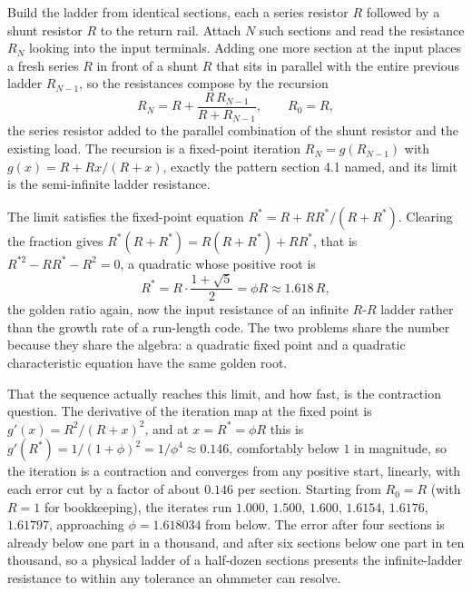 Build the ladder from identical sections, each a series resistor $R$
followed by a shunt resistor $R$ to the return rail. Attach $N$ such
sections and read the resistance $R_{N}$ looking into the input
terminals. Adding one more section at the input places a fresh series $R$
in front of a shunt $R$ that sits in parallel with the entire previous
ladder $R_{N-1}$, so the resistances compose by the recursion
\[
R_{N} = R + \frac{R\,R_{N-1}}{R + R_{N-1}}, \qquad R_{0} = R,
\]
the series resistor added to the parallel combination of the shunt
resistor and the existing load. The recursion is a fixed-point iteration
$R_{N} = g(R_{N-1})$ with $g(x) = R + Rx/(R + x)$, exactly the pattern
section 4.1 named, and its limit is the semi-infinite ladder resistance.

The limit satisfies the fixed-point equation $R^{*} = R + R R^{*}/(R +
R^{*})$. Clearing the fraction gives $R^{*}(R + R^{*}) = R(R + R^{*}) +
R R^{*}$, that is $R^{*2} - R R^{*} - R^{2} = 0$, a quadratic whose
positive root is
\[
R^{*} = R \cdot \frac{1 + \sqrt 5}{2} = \phi R \approx 1.618\,R,
\]
the golden ratio again, now the input resistance of an infinite $R$-$R$
ladder rather than the growth rate of a run-length code. The two problems
share the number because they share the algebra: a quadratic fixed point
and a quadratic characteristic equation have the same golden root.

That the sequence actually reaches this limit, and how fast, is the
contraction question. The derivative of the iteration map at the fixed
point is $g'(x) = R^{2}/(R + x)^{2}$, and at $x = R^{*} = \phi R$ this is
$g'(R^{*}) = 1/(1 + \phi)^{2} = 1/\phi^{4} \approx 0.146$, comfortably
below $1$ in magnitude, so the iteration is a contraction and converges
from any positive start, linearly, with each error cut by a factor of
about $0.146$ per section. Starting from $R_{0} = R$ (with $R = 1$ for
bookkeeping), the iterates run $1.000$, $1.500$, $1.600$, $1.6154$,
$1.6176$, $1.61797$, approaching $\phi = 1.618034$ from below. The error
after four sections is already below one part in a thousand, and after
six sections below one part in ten thousand, so a physical ladder of a
half-dozen sections presents the infinite-ladder resistance to within any
tolerance an ohmmeter can resolve.



